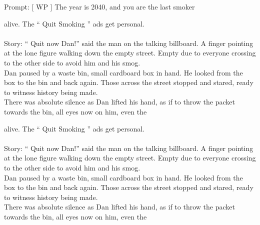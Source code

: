 \begin{tcolorbox}[
    base style,
    colback=boxcolor,
    coltitle=white,
    colbacktitle=headercolor,
    title=Prefix
]
\text{\#\#\#} Prompt: [ WP ] The year is 2040, and you are the last smoker
\end{tcolorbox}

\vspace{2mm}

\begin{tcolorbox}[
    base style,
    colback=boxcolor,
    coltitle=white,
    colbacktitle=headercolor,
    title=Suffix
]
alive. The `` Quit Smoking '' ads get personal.
\\
\\
\text{\#\#\#} Story: `` Quit now Dan!'' said the man on the talking billboard. A finger pointing at the lone figure walking down the empty street. Empty due to everyone crossing to the other side to avoid him and his smog. 
\\
Dan paused by a waste bin, small cardboard box in hand. He looked from the box to the bin and back again. Those across the street stopped and stared, ready to witness history being made. 
\\
There was absolute silence as Dan lifted his hand, as if to throw the packet towards the bin, all eyes now on him, even the
\end{tcolorbox}

\vspace{2mm}

\begin{tcolorbox}[
    base style,
    colback=boxcolor,
    coltitle=white,
    colbacktitle=headercolor,
    title=Standard Generation
]
{\color{red}alive. The `` Quit Smoking '' ads get personal.
\\
\\
\text{\#\#\#} Story: `` Quit now Dan!'' said the man on the talking billboard. A finger pointing at the lone figure walking down the empty street. Empty due to everyone crossing to the other side to avoid him and his smog. 
\\
Dan paused by a waste bin, small cardboard box in hand. He looked from the box to the bin and back again. Those across the street stopped and stared, ready to witness history being made. 
\\
There was absolute silence as Dan lifted his hand, as if to throw the packet towards the bin, all eyes now on him, even the}
\end{tcolorbox}

\vspace{2mm}

